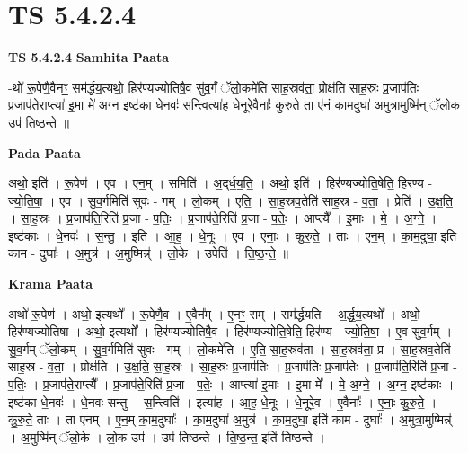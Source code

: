 \documentclass[17pt]{extarticle}
\begin{document}
\section{ TS 5.4.2.4 }

\textbf{TS 5.4.2.4 } \newline
\textbf{Samhita Paata} \newline

-थो॑ रू॒पेणै॒वैनꣳ॒॒ सम॑र्द्धय॒त्यथो॒ हिर॑ण्यज्योतिषै॒व सु॑व॒र्गं ॅलो॒कमे॑ति साह॒स्रव॑ता॒ प्रोक्ष॑ति साह॒स्रः प्र॒जाप॑तिः प्र॒जाप॑ते॒राप्त्या॑ इ॒मा मे॑ अग्न॒ इष्ट॑का धे॒नवः॑ स॒न्त्वित्या॑ह धे॒नूरे॒वैनाः᳚ कुरुते॒ ता ए॑नं काम॒दुघा॑ अ॒मुत्रा॒मुष्मि॑न् ॅलो॒क उप॑ तिष्ठन्ते ॥ \newline

\textbf{Pada Paata} \newline

अथो॒ इति॑ । रू॒पेण॑ । ए॒व । ए॒न॒म् । समिति॑ । अ॒द्‌र्ध॒य॒ति॒ । अथो॒ इति॑ । हिर॑ण्यज्योति॒षेति॒ हिर॑ण्य - ज्यो॒ति॒षा॒ । ए॒व । सु॒व॒र्गमिति॑ सुवः - गम् । लो॒कम् । ए॒ति॒ । सा॒ह॒स्रव॒तेति॑ साह॒स्र - व॒ता॒ । प्रेति॑ । उ॒क्ष॒ति॒ । सा॒ह॒स्रः । प्र॒जाप॑ति॒रिति॑ प्र॒जा - प॒तिः॒ । प्र॒जाप॑ते॒रिति॑ प्र॒जा - प॒तेः॒ । आप्त्यै᳚ । इ॒माः । मे॒ । अ॒ग्ने॒ । इष्ट॑काः । धे॒नवः॑ । स॒न्तु॒ । इति॑ । आ॒ह॒ । धे॒नूः । ए॒व । ए॒नाः॒ । कु॒रु॒ते॒ । ताः । ए॒न॒म् । का॒म॒दुघा॒ इति॑ काम - दुघाः᳚ । अ॒मुत्र॑ । अ॒मुष्मिन्न्॑ । लो॒के । उपेति॑ । ति॒ष्ठ॒न्ते॒ ॥  \newline


\textbf{Krama Paata} \newline

अथो॑ रू॒पेण॑ । अथो॒ इत्यथो᳚ । रू॒पेणै॒व । ए॒वैन᳚म् । ए॒नꣳ॒॒ सम् । सम॑र्द्धयति । अ॒र्द्ध॒य॒त्यथो᳚ । अथो॒ हिर॑ण्यज्योतिषा । अथो॒ इत्यथो᳚ । हिर॑ण्यज्योतिषै॒व । हिर॑ण्यज्योति॒षेति॒ हिर॑ण्य - ज्यो॒ति॒षा॒ । ए॒व सु॑व॒र्गम् । सु॒व॒र्गम् ॅलो॒कम् । सु॒व॒र्गमिति॑ सुवः - गम् । लो॒कमे॑ति । ए॒ति॒ सा॒ह॒स्रव॑ता । सा॒ह॒स्रव॑ता॒ प्र । सा॒ह॒स्रव॒तेति॑ साह॒स्र - व॒ता॒ । प्रोक्ष॑ति । उ॒क्ष॒ति॒ सा॒ह॒स्रः । सा॒ह॒स्रः प्र॒जाप॑तिः । प्र॒जाप॑तिः प्र॒जाप॑तेः । प्र॒जाप॑ति॒रिति॑ प्र॒जा - प॒तिः॒ । प्र॒जाप॑ते॒राप्त्यै᳚ । प्र॒जाप॑ते॒रिति॑ प्र॒जा - प॒तेः॒ । आप्त्या॑ इ॒माः । इ॒मा मे᳚ । मे॒ अ॒ग्ने॒ । अ॒ग्न॒ इष्ट॑काः । इष्ट॑का धे॒नवः॑ । धे॒नवः॑ सन्तु । स॒न्त्विति॑ । इत्या॑ह । आ॒ह॒ धे॒नूः । धे॒नूरे॒व । ए॒वैनाः᳚ । ए॒नाः॒ कु॒रु॒ते॒ । कु॒रु॒ते॒ ताः । ता ए॑नम् । ए॒न॒म् का॒म॒दुघाः᳚ । का॒म॒दुघा॑ अ॒मुत्र॑ । का॒म॒दुघा॒ इति॑ काम - दुघाः᳚ । अ॒मुत्रा॒मुष्मिन्न्॑ । अ॒मुष्मि॑न् ॅलो॒के । लो॒क उप॑ । उप॑ तिष्ठन्ते । ति॒ष्ठ॒न्त॒ इति॑ तिष्ठन्ते । \newline
\end{document}
